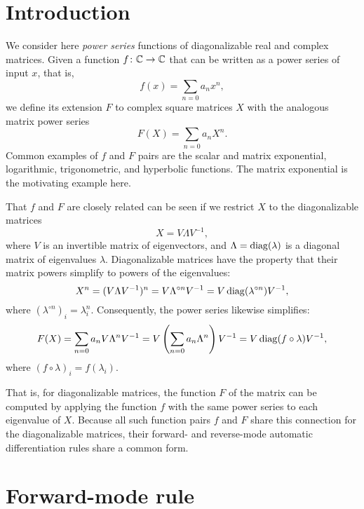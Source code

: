 \documentclass[../main.tex]{subfiles}
\begin{document}
\begin{refsection}


\section{Introduction}\label{introduction-1}

We consider here \emph{power series} functions of diagonalizable real and complex matrices.
Given a function $f \colon \mathbb{C} \to \mathbb{C}$ that can be written as a power series of input $x$, that is,
\[f(x) = \sum_{n=0} a_n x^n,\]
we define its extension $F$ to complex square matrices $X$ with the analogous matrix power series
\[F(X) = \sum_{n=0} a_n X^n.\]
Common examples of $f$ and $F$ pairs are the scalar and matrix exponential, logarithmic, trigonometric, and hyperbolic functions.
The matrix exponential is the motivating example here.

That $f$ and $F$ are closely related can be seen if we restrict $X$ to the diagonalizable matrices
\[X = V \Lambda V^{-1},\]
where $V$ is an invertible matrix of eigenvectors, and $\Lambda = \operatorname{diag}(\lambda)$ is a diagonal matrix of eigenvalues $\lambda$.
Diagonalizable matrices have the property that their matrix powers simplify to powers of the eigenvalues:
\[X^n = (V \Lambda V^{-1})^n = V \Lambda^{\circ n} V^{-1} = V \operatorname{diag}(\lambda^{\circ n}) V^{-1},\]
where $\left(\lambda^{\circ n}\right)_i = \lambda_i^n$.
Consequently, the power series likewise simplifies:
\[F(X) = \sum_{n=0} a_n V \Lambda^n V^{-1} = V \left( \sum_{n=0} a_n \Lambda^n \right) V^{-1} = V \operatorname{diag}(f \circ \lambda) V^{-1},\]
where $\left(f \circ \lambda\right)_i = f(\lambda_i)$.

That is, for diagonalizable matrices, the function $F$ of the matrix can be computed by applying the function $f$ with the same power series to each eigenvalue of $X$.
Because all such function pairs $f$ and $F$ share this connection for the diagonalizable matrices, their forward- and reverse-mode automatic differentiation rules share a common form.

\section{Forward-mode rule}\label{forward-mode-rule-1}


\end{refsection}
\end{document}
